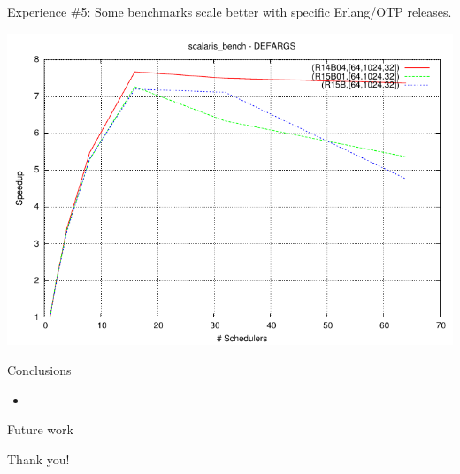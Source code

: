 \documentclass{beamer}
\begin{document}
\begin{frame}{Experience \#5: Some benchmarks scale better with specific Erlang/OTP releases.}
    \begin{center}
        \includegraphics[width=0.8\linewidth]{figures/scalaris-speedup-bulldozer.pdf}
    \end{center}
\end{frame}

\begin{frame}[t]{Conclusions}
	\begin{itemize}
		\item 
	\end{itemize}
\end{frame}

\begin{frame}[t]{Future work}
\end{frame}

\begin{frame}
	\vspace{50pt}
	\begin{center}
	Thank you!
	\end{center}
\end{frame}
\end{document}
